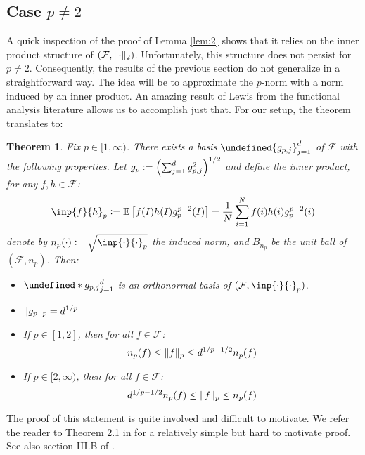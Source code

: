 \documentclass{article}
\theoremstyle{plain}
\newtheorem{theorem}[lemma]{Theorem}
\theoremstyle{definition}
\theoremstyle{remark}
\newcommand{\defeq}{\vcentcolon=}
\let\brace\undefined
\DeclarePairedDelimiter{\brace}{\lbrace}{\rbrace}
\DeclarePairedDelimiter{\paren}{\lparen}{\rparen}
\DeclarePairedDelimiter{\norm}{\lVert}{\rVert}
\newcommand{\E}[1]{\mathbb{E}\left[#1\right]}
\begin{document}
\subsection{Case $p \neq 2$}
A quick inspection of the proof of Lemma \ref{lem:2} shows that it relies on the inner product structure of $\paren*{\mathcal{F}, \norm{\cdot}_2}$. Unfortunately, this structure does not persist for $p \neq 2$. Consequently, the results of the previous section do not generalize in a straightforward way. The idea will be to approximate the $p$-norm with a norm induced by an inner product. An amazing result of Lewis \cite{lewis1978finite} from the functional analysis literature allows us to accomplish just that. For our setup, the theorem translates to:
\begin{theorem}
\label{th:2}
    Fix $p \in [1, \infty)$. There exists a basis $\brace{g_{p, j}}_{j=1}^{d}$ of $\mathcal{F}$ with the following properties. Let $g_p \defeq \paren*{\sum_{j=1}^{d}g_{p, j}^2}^{1/2}$ and define the inner product, for any $f, h \in \mathcal{F}$:
    \begin{equation*}
        \inp{f}{h}_p \defeq \E{f(I)h(I) g_p^{p-2}(I)} = \frac{1}{N} \sum_{i=1}^{N} f(i) h(i) g_p^{p-2}(i)
    \end{equation*}
    denote by $n_{p}(\cdot) \defeq \sqrt{\inp{\cdot}{\cdot}_p}$ the induced norm, and $B_{n_p}$ be the unit ball of $(\mathcal{F}, n_p)$. Then:
    \begin{itemize}
        \item $\brace*{g_{p, j}}_{j=1}^{d}$ is an orthonormal basis of $\paren{\mathcal{F}, \inp{\cdot}{\cdot}_p}$. \\
        \item $\norm{g_p}_p = d^{1/p}$ \\
        \item If $p \in [1,2]$, then for all $f \in \mathcal{F}$:
        \begin{equation*}
            n_p(f) \leq \norm{f}_p \leq d^{1/p - 1/2} n_p(f)
        \end{equation*}
        \item If $p \in [2, \infty)$, then for all $f \in \mathcal{F}$:
        \begin{equation*}
            d^{1/p - 1/2}n_p(f) \leq \norm{f}_p \leq n_p(f)
        \end{equation*}
    \end{itemize}
\end{theorem}
The proof of this statement is quite involved and difficult to motivate. We refer the reader to Theorem 2.1 in \cite{schechtman2001embedding} for a relatively simple but hard to motivate proof. See also section III.B of \cite{wojtaszczyk1996banach}.
\end{document}

